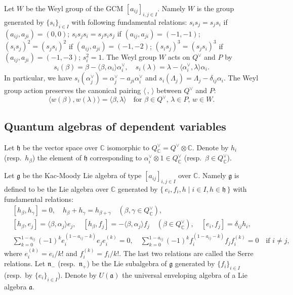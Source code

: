 \documentclass[12pt,twoside]{article}
\newcommand\bra{\langle}
\newcommand\ket{\rangle}
\newcommand\av{\alpha^\vee}
\newcommand\Qv{Q^\vee}
\newcommand\g{{\mathfrak g}}
\newcommand\h{{\mathfrak h}}
\newcommand\n{{\mathfrak n}}
\newcommand\C{{\mathbb C}} %
\theoremstyle{plain} %
\theoremstyle{definition} %
\theoremstyle{definition} %
\numberwithin{theorem}{section}
\numberwithin{equation}{section}
\numberwithin{figure}{section}
\numberwithin{table}{section}
\begin{document}
Let $W$ be the Weyl group of the GCM $[a_{ij}]_{i,j\in I}$.
Namely $W$ is the group generated by $\{s_i\}_{i\in I}$
with following fundamental relations:
$s_is_j=s_js_i$         if $(a_{ij},a_{ji})=(0,0)$;
$s_is_js_i=s_js_is_j$   if $(a_{ij},a_{ji})=(-1,-1)$;
$(s_is_j)^2=(s_js_i)^2$ if $(a_{ij},a_{ji})=(-1,-2)$;
$(s_is_j)^3=(s_js_i)^3$ if $(a_{ij},a_{ji})=(-1,-3)$;
$s_i^2=1$.
The Weyl group $W$ acts on $\Qv$ and $P$ by
\begin{equation*}
 s_i(\beta)=\beta-\bra\beta,\alpha_i\ket\av_i, \quad
 s_i(\lambda)=\lambda-\bra\av_i,\lambda\ket\alpha_i.
\end{equation*}
In particular, we have
$s_i(\av_j)=\av_j-a_{ji}\av_i$ and
$s_i(\Lambda_j)=\Lambda_j-\delta_{ij}\alpha_i$.
The Weyl group action preserves 
the canonical pairing $\bra\,,\,\ket$ between $\Qv$ and $P$:
\begin{equation*}
 \bra w(\beta),w(\lambda)\ket 
 = \bra\beta,\lambda\ket
 \quad
 \text{for $\beta\in\Qv$, $\lambda\in P$, $w\in W$}.
\end{equation*}


\subsection{Quantum algebras of dependent variables}
\label{sec:A}

Let $\h$ be the vector space over $\C$ isomorphic to $\Qv_\C=\Qv\otimes\C$.
Denote by $h_i$ (resp.\ $h_\beta$) 
the element of $\h$ corresponding to $\av_i\otimes1\in\Qv_\C$
(resp.\ $\beta\in\Qv_\C$).

Let $\g$ be the Kac-Moody Lie algebra of type $[a_{ij}]_{i,j\in I}$ 
over $\C$. Namely $\g$ is defined to be the Lie algebra over $\C$ 
generated by $\{\,e_i,f_i,h\mid i\in I, h\in\h \,\}$ with fundamental relations:
\begin{align*}
 &
 [h_\beta,h_\gamma] = 0, \quad h_\beta+h_\gamma=h_{\beta+\gamma} 
 \quad (\beta,\gamma\in\Qv_\C), 
 \\ &
 [h_\beta, e_j] =  \bra\beta,\alpha_j\ket e_j, \quad
 [h_\beta, f_j] = -\bra\beta,\alpha_j\ket f_j \quad (\beta\in\Qv_\C), \quad
 [e_i,f_j] = \delta_{ij}h_i,
 \\ &
 \sum_{k=0}^{1-a_{ij}} 
 (-1)^k e_i^{(1-a_{ij}-k)}e_je_i^{(k)} = 0,
 \quad
 \sum_{k=0}^{1-a_{ij}} 
 (-1)^k f_i^{(1-a_{ij}-k)}f_jf_i^{(k)} = 0
 \quad\text{if $i\ne j$},
\end{align*}
where $e_i^{(k)}=e_i/k!$ and $f_i^{(k)}=f_i/k!$.
The last two relations are called the Serre relations.
Let $\n_-$ (resp.\ $\n_+$) be 
the Lie subalgebra of $\g$ generated by $\{f_i\}_{i\in I}$
(resp.\ by $\{e_i\}_{i\in I}$).
Denote by $U(\mathfrak{a})$ the universal enveloping algebra of a Lie 
algebra $\mathfrak{a}$.
\end{document}

